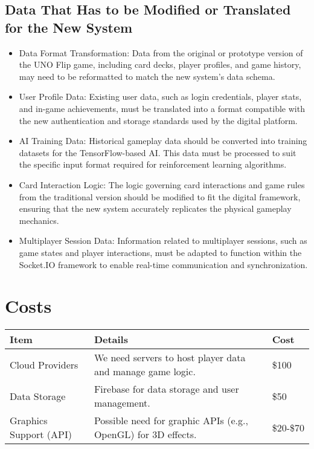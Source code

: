 \documentclass{article}
\begin{document}
\subsection{Data That Has to be Modified or Translated for the New System}
\begin{itemize}
    \item Data Format Transformation: Data from the original or prototype version of the UNO Flip game, including card decks, player profiles, and game history, may need to be reformatted to match the new system's data schema.
    \item User Profile Data: Existing user data, such as login credentials, player stats, and in-game achievements, must be translated into a format compatible with the new authentication and storage standards used by the digital platform.
    \item AI Training Data: Historical gameplay data should be converted into training datasets for the TensorFlow-based AI. This data must be processed to suit the specific input format required for reinforcement learning algorithms.
    \item Card Interaction Logic: The logic governing card interactions and game rules from the traditional version should be modified to fit the digital framework, ensuring that the new system accurately replicates the physical gameplay mechanics.
    \item Multiplayer Session Data: Information related to multiplayer sessions, such as game states and player interactions, must be adapted to function within the Socket.IO framework to enable real-time communication and synchronization.
\end{itemize}

\section{Costs}
\begin{tabular}{|l|l|l|}
\hline
\textbf{Item} & \textbf{Details} & \textbf{Cost} \\
\hline
Cloud Providers & We need servers to host player data and manage game logic. & \$100 \\
Data Storage & Firebase for data storage and user management. & \$50 \\
Graphics Support (API) & Possible need for graphic APIs (e.g., OpenGL) for 3D effects. & \$20-\$70 \\
\hline
\end{tabular}
\end{document}

